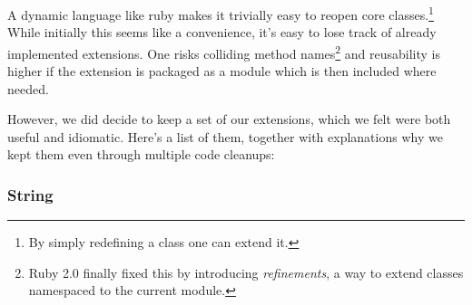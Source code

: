 A dynamic language like ruby makes it trivially easy to reopen core classes.\footnote{By simply redefining a class one can extend it.} While initially this seems like a convenience, it's easy to lose track of already implemented extensions. One risks colliding method names\footnote{Ruby 2.0 finally fixed this by introducing \emph{refinements}, a way to extend classes namespaced to the current module.} and reusability is higher if the extension is packaged as a module which is then included where needed.

However, we did decide to keep a set of our extensions, which we felt were both useful and idiomatic. Here's a list of them, together with explanations why we kept them even through multiple code cleanups:

\subsubsection{String}

